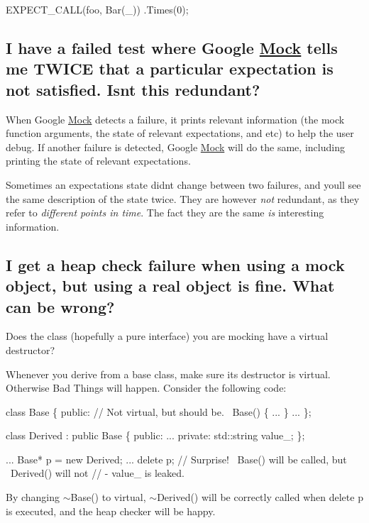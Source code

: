 \begin{DoxyCode}
EXPECT\_CALL(foo, Bar(\_))
    .Times(0);
\end{DoxyCode}


\subsection*{I have a failed test where Google \hyperlink{class_mock}{Mock} tells me T\+W\+I\+CE that a particular expectation is not satisfied. Isn\textquotesingle{}t this redundant?}

When Google \hyperlink{class_mock}{Mock} detects a failure, it prints relevant information (the mock function arguments, the state of relevant expectations, and etc) to help the user debug. If another failure is detected, Google \hyperlink{class_mock}{Mock} will do the same, including printing the state of relevant expectations.

Sometimes an expectation\textquotesingle{}s state didn\textquotesingle{}t change between two failures, and you\textquotesingle{}ll see the same description of the state twice. They are however {\itshape not} redundant, as they refer to {\itshape different points in time}. The fact they are the same {\itshape is} interesting information.

\subsection*{I get a heap check failure when using a mock object, but using a real object is fine. What can be wrong?}

Does the class (hopefully a pure interface) you are mocking have a virtual destructor?

Whenever you derive from a base class, make sure its destructor is virtual. Otherwise Bad Things will happen. Consider the following code\+:


\begin{DoxyCode}
class Base \{
 public:
  // Not virtual, but should be.
  ~Base() \{ ... \}
  ...
\};

class Derived : public Base \{
 public:
  ...
 private:
  std::string value\_;
\};

...
  Base* p = new Derived;
  ...
  delete p;  // Surprise! ~Base() will be called, but ~Derived() will not
             // - value\_ is leaked.
\end{DoxyCode}


By changing {\ttfamily $\sim$\+Base()} to virtual, {\ttfamily $\sim$\+Derived()} will be correctly called when {\ttfamily delete p} is executed, and the heap checker will be happy.

